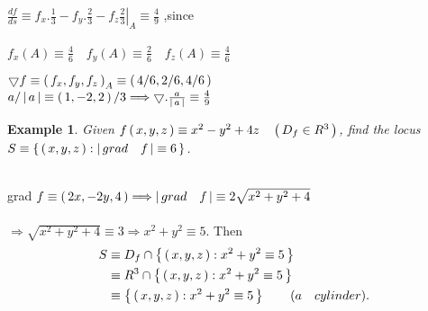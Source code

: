 \documentclass{amsbook}
\newtheorem{example}{Example} %
\begin{document}
\begin{hSolution}
    \begin{hEnumerateAlpha}
        \item $\frac{df}{ds}	\equiv f_x .\frac{1}{3}- f_y. \frac{2}{3}-f_z \left. \frac{2}{3} \right|_{A} 	\equiv \frac{4}{9}$ ,since\\ \\
        
        $f_x(A)	\equiv \frac{4}{6} \quad f_y(A) 	\equiv \frac{2}{6} \quad f_z(A) 	\equiv \frac{4}{6}$ \\
        
        \item $\bigtriangledown f 	\equiv  \left( \, f_x, f_y, f_z \, \right) _A 	\equiv  \left( \,  4/6 , 2/6 , 4/6 \, \right)  $ \\
        
        $a/\left \lvert \, a \, \right \rvert 	\equiv  \left( \, 1, -2, 2 \, \right) /3  \Longrightarrow \bigtriangledown . \frac{a}{\left \lvert \, a \, \right \rvert}	\equiv \frac{4}{9}$ \\
    \end{hEnumerateAlpha}
\end{hSolution}

    \begin{example}
        Given $ f \left( \, x, y, z \, \right)  	\equiv x^2- y^2 + 4z \quad  \left( \, D_f \in R^3 \, \right) $, find the locus \\
        $S 	\equiv  \left \{ \,  \left( \, x, y, z \, \right)  : \left \lvert \, grad \quad f \, \right \rvert 	\equiv 6 \, \right \} $.
    \end{example} 
    
\begin{hSolution}
    \\ grad $ f 	\equiv  \left( \,  2x, -2y, 4 \, \right)  \Longrightarrow  \left \lvert \, grad \quad f \, \right \rvert 	\equiv 2\sqrt{ x^2 + y^2 + 4}$ \\ \\
    $\Longrightarrow  \sqrt{x^2 + y^2 + 4} 	\equiv 3 \Longrightarrow  x^2 + y^2 	\equiv 5.$ Then \\
    \begin{align*}
        S 
        & 	\equiv D_f \cap  \left \{ \,  \left( \, x, y, z \, \right)  : x^2 + y^2 	\equiv 5 \, \right \}  \\
        & 	\equiv R^3 \cap  \left \{ \,  \left( \, x, y, z \, \right)  : x^2 + y^2 	\equiv 5 \, \right \}  \\
        & 	\equiv  \left \{ \,  \left( \, x, y, z \, \right)  : x^2 + y^2 	\equiv 5 \, \right \}  \quad \quad  (a \quad cylinder).
    \end{align*}
    
\end{hSolution}    
\end{document}
